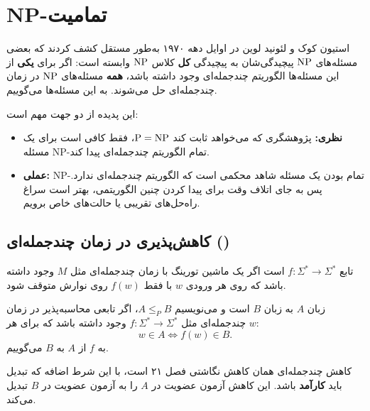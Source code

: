 \chapter{NP-تمامیت}

استیون کوک و لئونید لوین در اوایل دهه ۱۹۷۰ به‌طور مستقل کشف کردند که بعضی مسئله‌های $\mathrm{NP}$ پیچیدگی‌شان به پیچیدگی \textbf{کل} کلاس $\mathrm{NP}$ وابسته است: اگر برای \textbf{یکی} از این مسئله‌ها الگوریتم چندجمله‌ای وجود داشته باشد، \textbf{همه} مسئله‌های $\mathrm{NP}$ در زمان چندجمله‌ای حل می‌شوند. به این مسئله‌ها  می‌گوییم.

این پدیده از دو جهت مهم است:
\begin{itemize}
\item \textbf{نظری:} پژوهشگری که می‌خواهد ثابت کند $\mathrm{P}=\mathrm{NP}$، فقط کافی است برای یک مسئله NP-تمام الگوریتم چندجمله‌ای پیدا کند.
\item \textbf{عملی:} NP-تمام بودن یک مسئله شاهد محکمی است که الگوریتم چندجمله‌ای ندارد. پس به جای اتلاف وقت برای پیدا کردن چنین الگوریتمی، بهتر است سراغ راه‌حل‌های تقریبی یا حالت‌های خاص برویم.
\end{itemize}

\section{کاهش‌پذیری در زمان چندجمله‌ای ()}

\begin{definition}
تابع $f:\Sigma^*\to\Sigma^*$  است اگر یک ماشین تورینگ با زمان چندجمله‌ای مثل $M$ وجود داشته باشد که روی هر ورودی $w$ با فقط $f(w)$ روی نوارش متوقف شود.
\end{definition}

\begin{definition}
زبان $A$  به زبان $B$ است و می‌نویسیم $A\le_PB$، اگر تابعی محاسبه‌پذیر در زمان چندجمله‌ای مثل $f:\Sigma^*\to\Sigma^*$ وجود داشته باشد که برای هر $w$:
\[w\in A\iff f(w)\in B.\]
به $f$  از $A$ به $B$ می‌گوییم.
\end{definition}

کاهش چندجمله‌ای همان کاهش نگاشتی فصل ۲۱ است، با این شرط اضافه که تبدیل باید \textbf{کارآمد} باشد. این کاهش آزمون عضویت در $A$ را به آزمون عضویت در $B$ تبدیل می‌کند.

